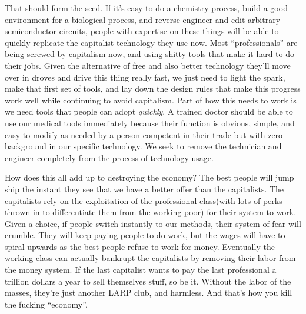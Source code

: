 That should form the seed. If it's easy to do a chemistry process, build
a good environment for a biological process, and reverse engineer and
edit arbitrary semiconductor circuits, people with expertise on these
things will be able to quickly replicate the capitalist technology they
use now. Most ``professionals'' are being screwed by capitalism now, and
using shitty tools that make it hard to do their jobs. Given the
alternative of free and also better technology they'll move over in
droves and drive this thing really fast, we just need to light the
spark, make that first set of tools, and lay down the design rules that
make this progress work well while continuing to avoid capitalism. Part
of how this needs to work is we need tools that people can adopt
\emph{quickly}. A trained doctor should be able to use our medical tools
immediately because their function is obvious, simple, and easy to
modify as needed by a person competent in their trade but with zero
background in our specific technology. We seek to remove the technician
and engineer completely from the process of technology usage.

How does this all add up to destroying the economy? The best people will
jump ship the instant they see that we have a better offer than the
capitalists. The capitalists rely on the exploitation of the
professional class(with lots of perks thrown in to differentiate them
from the working poor) for their system to work. Given a choice, if
people switch instantly to our methods, their system of fear will
crumble. They will keep paying people to do work, but the wages will
have to spiral upwards as the best people refuse to work for money.
Eventually the working class can actually bankrupt the capitalists by
removing their labor from the money system. If the last capitalist wants
to pay the last professional a trillion dollars a year to sell
themselves stuff, so be it. Without the labor of the masses, they're
just another LARP club, and harmless. And that's how you kill the
fucking ``economy''.
